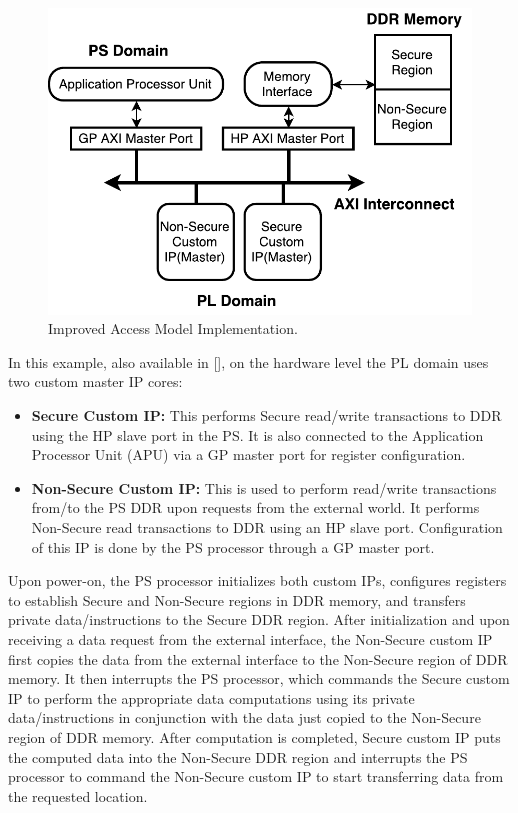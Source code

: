 \documentclass[sigconf]{acmart}
\theoremstyle{plain}
\theoremstyle{remark}
\begin{document}
\begin{figure}[hbt]
\centering
\includegraphics[width=1\columnwidth]{figures/TrustZoneHardware.pdf}
\caption{Improved Access Model Implementation.} %
\label{fig:trustzone}
\end{figure}

In this example, also available in [], on the hardware level the PL domain uses two custom master IP cores:

\begin{itemize}
\item \textbf{Secure Custom IP:}
This performs Secure read/write transactions to DDR using the HP slave port in the PS. It is also connected to the Application Processor Unit (APU) via a GP master port for register configuration.
\item \textbf{Non-Secure Custom IP:}
This is used to perform read/write transactions from/to the PS DDR upon requests from the external world. It performs Non-Secure read transactions to DDR using an HP slave port. Configuration of this IP is done by the PS processor through a GP master port.
\end{itemize}

Upon power-on, the PS processor initializes both custom IPs, configures registers to establish Secure and Non-Secure regions in DDR memory, and transfers private data/instructions to the Secure DDR region. After initialization and upon receiving a data request from the external interface, the
Non-Secure custom IP first copies the data from the external interface to the Non-Secure region of DDR memory. It then interrupts the PS processor, which commands the Secure custom IP to perform the appropriate data computations using its private data/instructions in conjunction with the data just copied to the Non-Secure region of DDR memory. After computation is completed, Secure custom IP puts the computed data into the Non-Secure DDR region and interrupts the PS processor to command the Non-Secure custom IP to start transferring data from the requested location.
\end{document}
